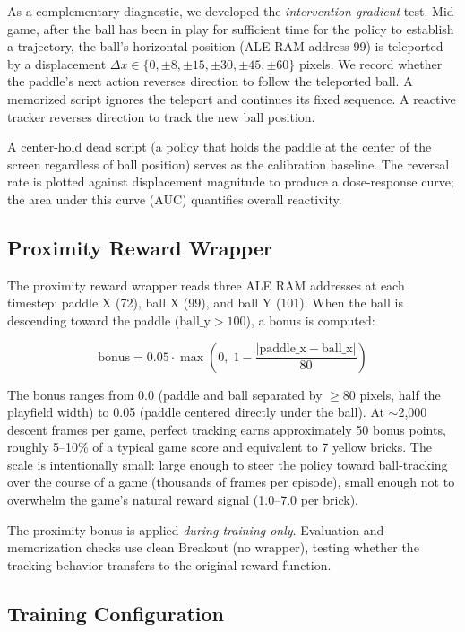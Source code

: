 \documentclass[11pt]{article}
\begin{document}
As a complementary diagnostic, we developed the \emph{intervention gradient}
test. Mid-game, after the ball has been in play for sufficient time for the
policy to establish a trajectory, the ball's horizontal position (ALE RAM
address 99) is teleported by a displacement $\Delta x \in \{0, \pm8, \pm15,
\pm30, \pm45, \pm60\}$ pixels. We record whether the paddle's next action
reverses direction to follow the teleported ball. A memorized script ignores
the teleport and continues its fixed sequence. A reactive tracker reverses
direction to track the new ball position.

A center-hold dead script (a policy that holds the paddle at the center of
the screen regardless of ball position) serves as the calibration baseline.
The reversal rate is plotted against displacement magnitude to produce a
dose-response curve; the area under this curve (AUC) quantifies overall
reactivity.

\subsection{Proximity Reward Wrapper}

The proximity reward wrapper reads three ALE RAM addresses at each timestep:
paddle X (72), ball X (99), and ball Y (101). When the ball is descending
toward the paddle ($\text{ball\_y} > 100$), a bonus is computed:

\begin{equation}
    \text{bonus} = 0.05 \cdot \max\left(0, \; 1 - \frac{|\text{paddle\_x} -
    \text{ball\_x}|}{80}\right)
\end{equation}

The bonus ranges from 0.0 (paddle and ball separated by $\geq$80 pixels, half
the playfield width) to 0.05 (paddle centered directly under the ball). At
$\sim$2,000 descent frames per game, perfect tracking earns approximately 50
bonus points, roughly 5--10\% of a typical game score and equivalent to 7
yellow bricks. The scale is intentionally small: large enough to steer the
policy toward ball-tracking over the course of a game (thousands of frames per episode), small enough not to overwhelm the game's
natural reward signal (1.0--7.0 per brick).

The proximity bonus is applied \emph{during training only}.
Evaluation and memorization checks use clean Breakout (no wrapper), testing
whether the tracking behavior transfers to the original reward function.

\subsection{Training Configuration}
\end{document}
